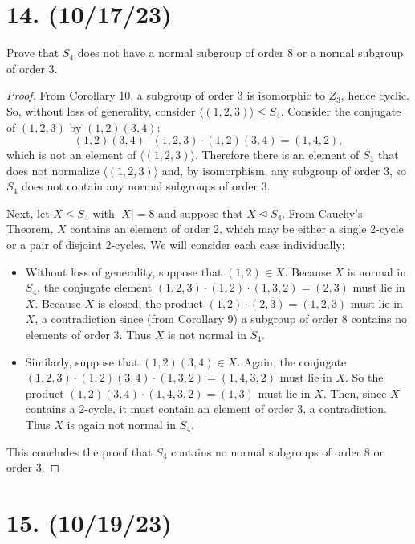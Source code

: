 \documentclass{article}
\begin{document}
\section*{14. (10/17/23)}

Prove that $S_4$ does not have a normal subgroup of order 8 or a normal subgroup of order 3.

\begin{proof}
    From Corollary 10, a subgroup of order 3 is isomorphic to $Z_3$, hence cyclic. So, without loss of generality, consider $\langle (1, 2, 3) \rangle \leq S_4$. Consider the conjugate of $(1, 2, 3)$ by $(1, 2)(3, 4)$:
    \begin{equation*}
        (1, 2)(3, 4) \cdot (1, 2, 3) \cdot (1, 2)(3, 4) = (1, 4, 2),
    \end{equation*}
    which is not an element of $\langle (1, 2, 3) \rangle$. Therefore there is an element of $S_4$ that does not normalize $\langle (1, 2, 3) \rangle$ and, by isomorphism, any subgroup of order 3, so $S_4$ does not contain any normal subgroups of order 3.
    
    Next, let $X \leq S_4$ with $|X| = 8$ and suppose that $X \unlhd S_4$. From Cauchy's Theorem, $X$ contains an element of order 2, which may be either a single 2-cycle or a pair of disjoint 2-cycles. We will consider each case individually:
    \begin{itemize}
        \item Without loss of generality, suppose that $(1, 2) \in X$. Because $X$ is normal in $S_4$, the conjugate element $(1, 2, 3) \cdot (1, 2) \cdot (1, 3, 2) = (2, 3)$ must lie in $X$. Because $X$ is closed, the product $(1, 2) \cdot (2, 3) = (1, 2, 3)$ must lie in $X$, a contradiction since (from Corollary 9) a subgroup of order 8 contains no elements of order 3. Thus $X$ is not normal in $S_4$.
        \item Similarly, suppose that $(1, 2)(3, 4) \in X$. Again, the conjugate $(1, 2, 3) \cdot (1, 2)(3, 4) \cdot (1, 3, 2) = (1, 4, 3, 2)$ must lie in $X$. So the product $(1, 2)(3, 4) \cdot (1, 4, 3, 2) = (1, 3)$ must lie in $X$. Then, since $X$ contains a 2-cycle, it must contain an element of order 3, a contradiction. Thus $X$ is again not normal in $S_4$.
    \end{itemize}
    This concludes the proof that $S_4$ contains no normal subgroups of order 8 or order 3.
\end{proof}

\section*{15. (10/19/23)}
\end{document}

